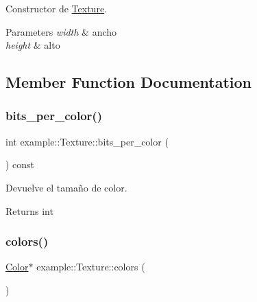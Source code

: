 Constructor de \mbox{\hyperlink{classexample_1_1_texture}{Texture}}. 


\begin{DoxyParams}{Parameters}
{\em width} & ancho \\
\hline
{\em height} & alto \\
\hline
\end{DoxyParams}


\subsection{Member Function Documentation}
\mbox{\label{classexample_1_1_texture_adbd81b5ef83a13ee25fb0006040a3db9}} 
\subsubsection{\texorpdfstring{bits\_per\_color()}{bits\_per\_color()}}
{\footnotesize\ttfamily int example\+::\+Texture\+::bits\+\_\+per\+\_\+color (\begin{DoxyParamCaption}{ }\end{DoxyParamCaption}) const\hspace{0.3cm}{\ttfamily [inline]}}



Devuelve el tamaño de color. 

\begin{DoxyReturn}{Returns}
int 
\end{DoxyReturn}
\mbox{\label{classexample_1_1_texture_ab613441c591db8dccfe13573eb1684d4}} 
\subsubsection{\texorpdfstring{colors()}{colors()}\hspace{0.1cm}{\footnotesize\ttfamily [1/2]}}
{\footnotesize\ttfamily \mbox{\hyperlink{classexample_1_1_color___r_g_b_a8888}{Color}}$\ast$ example\+::\+Texture\+::colors (\begin{DoxyParamCaption}{ }\end{DoxyParamCaption})\hspace{0.3cm}{\ttfamily [inline]}}



